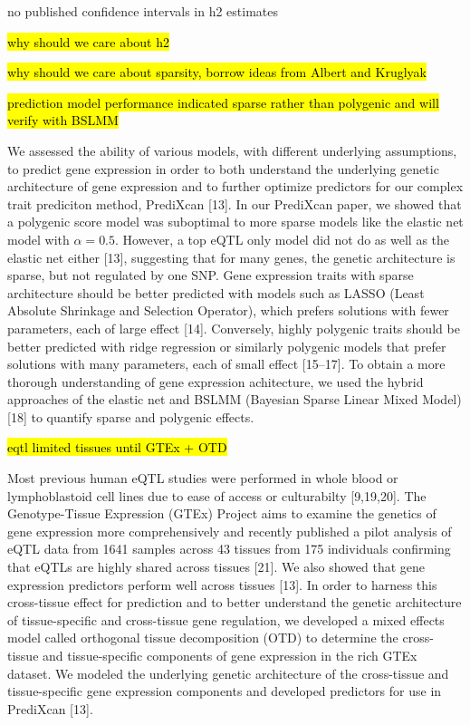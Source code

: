 \documentclass[]{article}
\begin{document}
no published confidence intervals in h2 estimates

\hl{why should we care about h2}

\hl{why should we care about sparsity, borrow ideas from Albert and Kruglyak}

\hl{prediction model performance indicated sparse rather than polygenic and will verify with BSLMM}

We assessed the ability of various models, with different underlying
assumptions, to predict gene expression in order to both understand the
underlying genetic architecture of gene expression and to further
optimize predictors for our complex trait prediciton method, PrediXcan
{[}13{]}. In our PrediXcan paper, we showed that a polygenic score model
was suboptimal to more sparse models like the elastic net model with
\(\alpha=0.5\). However, a top eQTL only model did not do as well as the
elastic net either {[}13{]}, suggesting that for many genes, the genetic
architecture is sparse, but not regulated by one SNP. Gene expression
traits with sparse architecture should be better predicted with models
such as LASSO (Least Absolute Shrinkage and Selection Operator), which
prefers solutions with fewer parameters, each of large effect {[}14{]}.
Conversely, highly polygenic traits should be better predicted with
ridge regression or similarly polygenic models that prefer solutions
with many parameters, each of small effect {[}15--17{]}. To obtain a
more thorough understanding of gene expression achitecture, we used the
hybrid approaches of the elastic net and BSLMM (Bayesian Sparse Linear
Mixed Model) {[}18{]} to quantify sparse and polygenic effects.

\hl{eqtl limited tissues until GTEx + OTD}

Most previous human eQTL studies were performed in whole blood or
lymphoblastoid cell lines due to ease of access or culturabilty
{[}9,19,20{]}. The Genotype-Tissue Expression (GTEx) Project aims to
examine the genetics of gene expression more comprehensively and
recently published a pilot analysis of eQTL data from 1641 samples
across 43 tissues from 175 individuals confirming that eQTLs are highly
shared across tissues {[}21{]}. We also showed that gene expression
predictors perform well across tissues {[}13{]}. In order to harness
this cross-tissue effect for prediction and to better understand the
genetic architecture of tissue-specific and cross-tissue gene
regulation, we developed a mixed effects model called orthogonal tissue
decomposition (OTD) to determine the cross-tissue and tissue-specific
components of gene expression in the rich GTEx dataset. We modeled the
underlying genetic architecture of the cross-tissue and tissue-specific
gene expression components and developed predictors for use in PrediXcan
{[}13{]}.
\end{document}
